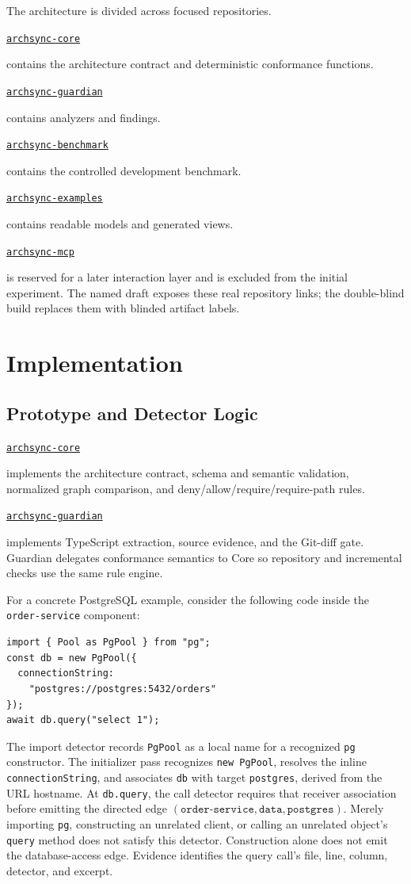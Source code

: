 \documentclass[conference]{IEEEtran}
\newif\ifarchsyncanonymous
\newcommand{\archsyncrepository}[2]{%
  \ifarchsyncanonymous
    \nolinkurl{#1} (blinded)%
  \else
    \href{#2}{\nolinkurl{#1}}%
  \fi
}
\begin{document}
The architecture is divided across focused repositories. \archsyncrepository{archsync-core}{https://github.com/Little-Boy-s-ArchSync/archsync-core} contains the architecture contract and deterministic conformance functions. \archsyncrepository{archsync-guardian}{https://github.com/Little-Boy-s-ArchSync/archsync-guardian} contains analyzers and findings. \archsyncrepository{archsync-benchmark}{https://github.com/Little-Boy-s-ArchSync/archsync-benchmark} contains the controlled development benchmark. \archsyncrepository{archsync-examples}{https://github.com/Little-Boy-s-ArchSync/archsync-examples} contains readable models and generated views. \archsyncrepository{archsync-mcp}{https://github.com/Little-Boy-s-ArchSync/archsync-mcp} is reserved for a later interaction layer and is excluded from the initial experiment. The named draft exposes these real repository links; the double-blind build replaces them with blinded artifact labels.

\section{Implementation}

\subsection{Prototype and Detector Logic}

\archsyncrepository{archsync-core}{https://github.com/Little-Boy-s-ArchSync/archsync-core} implements the architecture contract, schema and semantic validation, normalized graph comparison, and deny/allow/require/require-path rules. \archsyncrepository{archsync-guardian}{https://github.com/Little-Boy-s-ArchSync/archsync-guardian} implements TypeScript extraction, source evidence, and the Git-diff gate. Guardian delegates conformance semantics to Core so repository and incremental checks use the same rule engine.

For a concrete PostgreSQL example, consider the following code inside the \texttt{order-service} component:
\begin{verbatim}
import { Pool as PgPool } from "pg";
const db = new PgPool({
  connectionString:
    "postgres://postgres:5432/orders"
});
await db.query("select 1");
\end{verbatim}
The import detector records \texttt{PgPool} as a local name for a recognized \texttt{pg} constructor. The initializer pass recognizes \texttt{new PgPool}, resolves the inline \texttt{connectionString}, and associates \texttt{db} with target \texttt{postgres}, derived from the URL hostname. At \texttt{db.query}, the call detector requires that receiver association before emitting the directed edge $(\texttt{order-service},\texttt{data},\texttt{postgres})$. Merely importing \texttt{pg}, constructing an unrelated client, or calling an unrelated object's \texttt{query} method does not satisfy this detector. Construction alone does not emit the database-access edge. Evidence identifies the query call's file, line, column, detector, and excerpt.
\end{document}
